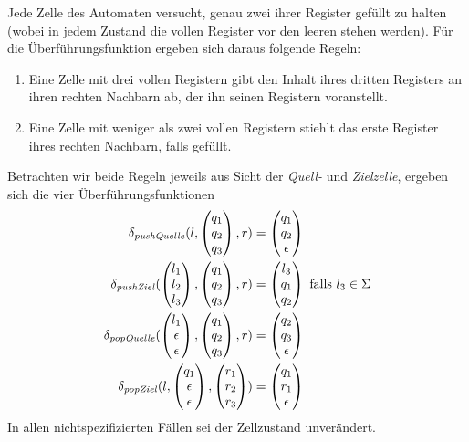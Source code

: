 \documentclass{article}
\begin{document}
Jede Zelle des Automaten versucht, genau zwei ihrer Register gefüllt zu halten (wobei in jedem Zustand die vollen Register vor den leeren stehen werden). Für die Überführungsfunktion ergeben sich daraus folgende Regeln:
\begin{enumerate}
    \item Eine Zelle mit drei vollen Registern gibt den Inhalt ihres dritten Registers an ihren rechten Nachbarn ab, der ihn seinen Registern voranstellt.
        \begin{center}
        \end{center}
    \item Eine Zelle mit weniger als zwei vollen Registern stiehlt das erste Register ihres rechten Nachbarn, falls gefüllt.
        \begin{center}
        \end{center}
\end{enumerate}

Betrachten wir beide Regeln jeweils aus Sicht der \emph{Quell-} und \emph{Zielzelle}, ergeben sich die vier Überführungsfunktionen
\begin{align*}
    \delta_{\mathit{pushQuelle}}(l,\begin{pmatrix}q_1\\q_2\\q_3\end{pmatrix},r) &= \begin{pmatrix}q_1\\q_2\\\epsilon\end{pmatrix} \\
    \delta_{\mathit{pushZiel}}(\begin{pmatrix}l_1\\l_2\\l_3\end{pmatrix},\begin{pmatrix}q_1\\q_2\\q_3\end{pmatrix},r) &= \begin{pmatrix}l_3\\q_1\\q_2\end{pmatrix} \text{ falls } l_3 \in \Sigma \\
    \delta_{\mathit{popQuelle}}(\begin{pmatrix}l_1\\\epsilon\\\epsilon\end{pmatrix},\begin{pmatrix}q_1\\q_2\\q_3\end{pmatrix},r) &= \begin{pmatrix}q_2\\q_3\\\epsilon\end{pmatrix} \\
    \delta_{\mathit{popZiel}}(l,\begin{pmatrix}q_1\\\epsilon\\\epsilon\end{pmatrix},\begin{pmatrix}r_1\\r_2\\r_3\end{pmatrix}) &= \begin{pmatrix}q_1\\r_1\\\epsilon\end{pmatrix}
\end{align*}
In allen nichtspezifizierten Fällen sei der Zellzustand unverändert.
\end{document}
